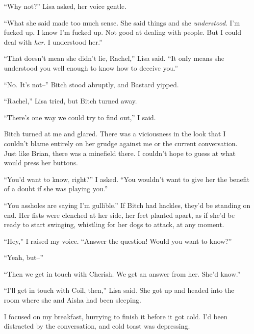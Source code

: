 ``Why not?''  Lisa asked, her voice gentle.



``What she said made too much sense.  She said things and she \emph{understood}.  I'm fucked up.  I know I'm fucked up.  Not good at dealing with people.  But I could deal with \emph{her}.  I understood her.''



``That doesn't mean she didn't lie, Rachel,'' Lisa said.  ``It only means she understood you well enough to know how to deceive you.''



``No.  It's not--''  Bitch stood abruptly, and Bastard yipped.



``Rachel,'' Lisa tried, but Bitch turned away.



``There's one way we could try to find out,'' I said.



Bitch turned at me and glared.  There was a viciousness in the look that I couldn't blame entirely on her grudge against me or the current conversation.  Just like Brian, there was a minefield there.  I couldn't hope to guess at what would press her buttons.



``You'd want to know, right?'' I asked.  ``You wouldn't want to give her the benefit of a doubt if she was playing you.''



``You assholes are saying I'm gullible.''  If Bitch had hackles, they'd be standing on end.  Her fists were clenched at her side, her feet planted apart, as if she'd be ready to start swinging, whistling for her dogs to attack, at any moment.



``Hey,'' I raised my voice.  ``Answer the question!  Would you want to know?''



``Yeah, but--''



``Then we get in touch with Cherish.  We get an answer from her.  She'd know.''



``I'll get in touch with Coil, then,'' Lisa said.  She got up and headed into the room where she and Aisha had been sleeping.



I focused on my breakfast, hurrying to finish it before it got cold.  I'd been distracted by the conversation, and cold toast was depressing.



